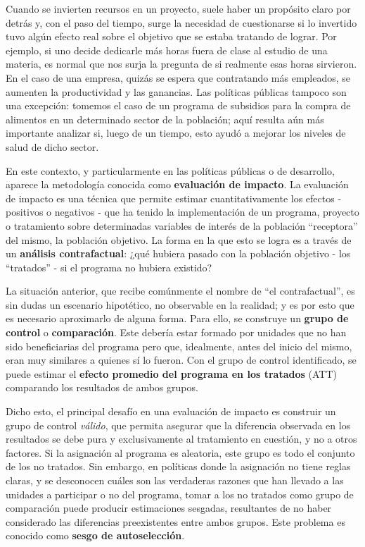 \documentclass[../main.tex]{subfiles}
\begin{document}
Cuando se invierten recursos en un proyecto, suele haber un propósito claro por detrás y,
con el paso del tiempo, surge la necesidad de cuestionarse si lo invertido tuvo algún
efecto real sobre el objetivo que se estaba tratando de lograr. Por ejemplo, si uno decide
dedicarle más horas fuera de clase al estudio de una materia, es normal que nos surja la
pregunta de si realmente esas horas sirvieron. En el caso de una empresa, quizás se
espera que contratando más empleados, se aumenten la productividad y las ganancias. Las
políticas públicas tampoco son una excepción: tomemos el caso de un programa de subsidios
para la compra de alimentos en un determinado sector de la población; aquí resulta aún más
importante analizar si, luego de un tiempo, esto ayudó a mejorar los niveles de salud de
dicho sector.

En este contexto, y particularmente en las políticas públicas o de desarrollo, aparece la
metodología conocida como \textbf{evaluación de impacto}. La evaluación de impacto es una
técnica que permite estimar cuantitativamente los efectos - positivos o negativos - que ha
tenido la implementación de un programa, proyecto o tratamiento sobre determinadas
variables de interés de la población ``receptora'' del mismo, la población objetivo. La
forma en la que esto se logra es a través de un \textbf{análisis contrafactual}: ¿qué
hubiera pasado con la población objetivo - los ``tratados'' - si el programa no hubiera
existido?

La situación anterior, que recibe comúnmente el nombre de ``el contrafactual'', es sin
dudas un escenario hipotético, no observable en la realidad; y es por esto que es
necesario aproximarlo de alguna forma. Para ello, se construye un \textbf{grupo de
control} o \textbf{comparación}. Este debería estar formado por unidades que no han sido
beneficiarias del programa pero que, idealmente, antes del inicio del mismo, eran muy
similares a quienes sí lo fueron. Con el grupo de control identificado, se puede estimar
el \textbf{efecto promedio del programa en los tratados} (ATT) comparando los resultados
de ambos grupos.

Dicho esto, el principal desafío en una evaluación de impacto es construir un grupo de
control \textit{válido}, que permita asegurar que la diferencia observada en los
resultados se debe pura y exclusivamente al tratamiento en cuestión, y no a otros
factores. Si la asignación al programa es aleatoria, este grupo es todo el conjunto de los
no tratados. Sin embargo, en políticas donde la asignación no tiene reglas claras, y se
desconocen cuáles son las verdaderas razones que han llevado a las unidades a participar o
no del programa, tomar a los no tratados como grupo de comparación puede producir
estimaciones sesgadas, resultantes de no haber considerado las diferencias preexistentes
entre ambos grupos. Este problema es conocido como \textbf{sesgo de autoselección}.
\end{document}

